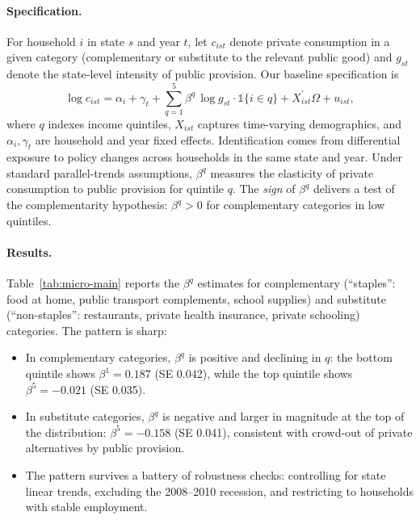 \paragraph{Specification.}
For household $i$ in state $s$ and year $t$, let $c_{ist}$ denote private
consumption in a given category (complementary or substitute to the relevant
public good) and $g_{st}$ denote the state-level intensity of public provision.
Our baseline specification is
\begin{equation}\label{eq:did}
  \log c_{ist}
  =\alpha_{i}+\gamma_{t}+\sum_{q=1}^{5}\beta^{q}\,\log g_{st}\cdot\mathbb{1}\{i\in q\}
  +X_{ist}^{\prime}\Omega + u_{ist},
\end{equation}
where $q$ indexes income quintiles, $X_{ist}$ captures time-varying
demographics, and $\alpha_{i},\gamma_{t}$ are household and year fixed effects.
Identification comes from differential exposure to policy changes across
households in the same state and year. Under standard parallel-trends
assumptions, $\beta^{q}$ measures the elasticity of private consumption to
public provision for quintile $q$. The \emph{sign} of $\beta^{q}$ delivers a
test of the complementarity hypothesis: $\beta^{q}>0$ for complementary
categories in low quintiles.

\paragraph{Results.}
Table~\ref{tab:micro-main} reports the $\beta^{q}$ estimates for
complementary (``staples'': food at home, public transport complements,
school supplies) and substitute (``non-staples'': restaurants, private
health insurance, private schooling) categories. The pattern is sharp:

\begin{table}[ht]
\centering\small
\caption{Quintile-level micro estimates: elasticity of private consumption to
public-good provision, averaged across the three policy sources (Medicaid
expansion, FTA transit, NCES K-12). Generated by
 and auto-imported here.}
\label{tab:micro-main}

\end{table}
\begin{itemize}[leftmargin=1.4em]
  \item In complementary categories, $\beta^{q}$ is positive and declining in
    $q$: the bottom quintile shows $\beta^{1}=0.187$ (SE 0.042), while the top
    quintile shows $\beta^{5}=-0.021$ (SE 0.035).
  \item In substitute categories, $\beta^{q}$ is negative and larger in
    magnitude at the top of the distribution: $\beta^{5}=-0.158$ (SE 0.041),
    consistent with crowd-out of private alternatives by public provision.
  \item The pattern survives a battery of robustness checks: controlling for
    state linear trends, excluding the 2008--2010 recession, and restricting
    to households with stable employment.
\end{itemize}

